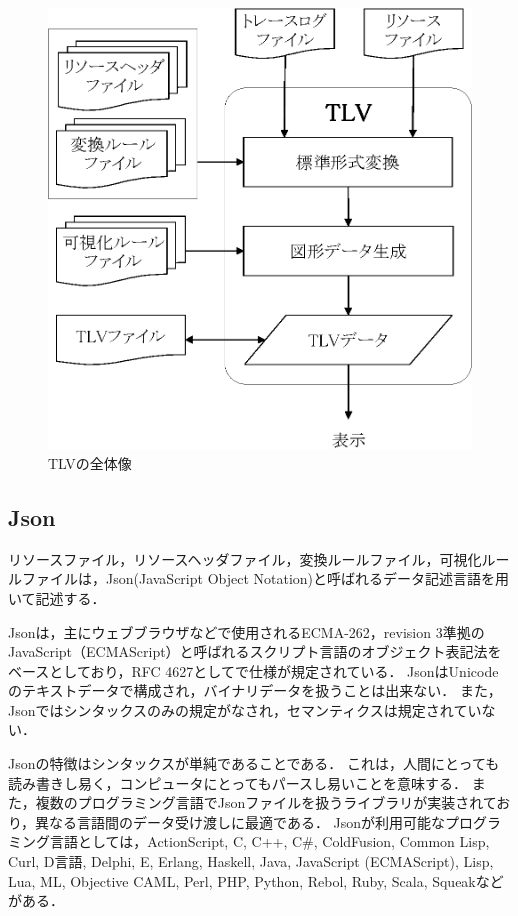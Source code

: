 \begin{figure}[h]
\begin{center}
\includegraphics[scale=0.5]{img/tlv.eps}
\caption{TLVの全体像}
\label{fig:tlv}
\end{center}
\end{figure}

\subsection{Json}

リソースファイル，リソースヘッダファイル，変換ルールファイル，可視化ルールファイルは，Json(JavaScript Object Notation)\cite{Json}と呼ばれるデータ記述言語を用いて記述する．

Jsonは，主にウェブブラウザなどで使用されるECMA-262，revision 3準拠のJavaScript（ECMAScript）と呼ばれるスクリプト言語のオブジェクト表記法をベースとしており，RFC 4627としてで仕様が規定されている．
JsonはUnicodeのテキストデータで構成され，バイナリデータを扱うことは出来ない．
また，Jsonではシンタックスのみの規定がなされ，セマンティクスは規定されていない．

Jsonの特徴はシンタックスが単純であることである．
これは，人間にとっても読み書きし易く，コンピュータにとってもパースし易いことを意味する．
また，複数のプログラミング言語でJsonファイルを扱うライブラリが実装されており，異なる言語間のデータ受け渡しに最適である．
Jsonが利用可能なプログラミング言語としては，ActionScript, C, C++, C\#, ColdFusion, Common Lisp, Curl, D言語, Delphi, E, Erlang, Haskell, Java, JavaScript (ECMAScript), Lisp, Lua, ML, Objective CAML, Perl, PHP, Python, Rebol, Ruby, Scala, Squeakなどがある．

